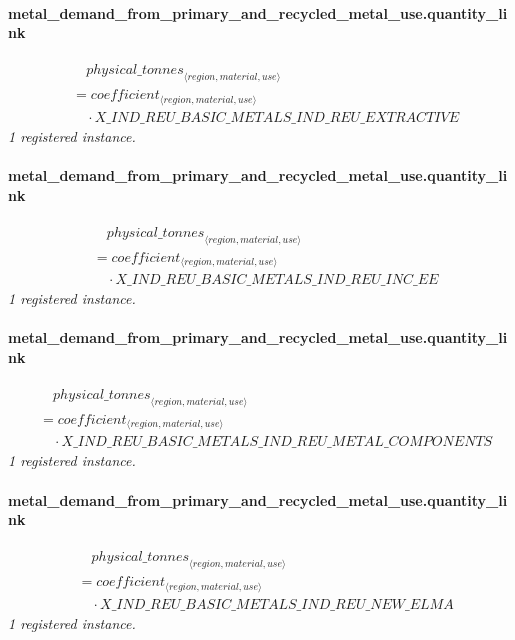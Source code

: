 \documentclass[11pt]{article}
\begin{document}
\paragraph{metal\_demand\_from\_primary\_and\_recycled\_metal\_use.quantity\_link}
\begin{align*}
&\quad {physical\_tonnes}_{\langle region, material, use\rangle}\\
&= coefficient_{\langle region, material, use\rangle}\\
&\quad {}\cdot X\_IND\_REU\_BASIC\_METALS\_IND\_REU\_EXTRACTIVE
\end{align*}
\noindent\emph{1 registered instance.}\par
\paragraph{metal\_demand\_from\_primary\_and\_recycled\_metal\_use.quantity\_link}
\begin{align*}
&\quad {physical\_tonnes}_{\langle region, material, use\rangle}\\
&= coefficient_{\langle region, material, use\rangle}\\
&\quad {}\cdot X\_IND\_REU\_BASIC\_METALS\_IND\_REU\_INC\_EE
\end{align*}
\noindent\emph{1 registered instance.}\par
\paragraph{metal\_demand\_from\_primary\_and\_recycled\_metal\_use.quantity\_link}
\begin{align*}
&\quad {physical\_tonnes}_{\langle region, material, use\rangle}\\
&= coefficient_{\langle region, material, use\rangle}\\
&\quad {}\cdot X\_IND\_REU\_BASIC\_METALS\_IND\_REU\_METAL\_COMPONENTS
\end{align*}
\noindent\emph{1 registered instance.}\par
\paragraph{metal\_demand\_from\_primary\_and\_recycled\_metal\_use.quantity\_link}
\begin{align*}
&\quad {physical\_tonnes}_{\langle region, material, use\rangle}\\
&= coefficient_{\langle region, material, use\rangle}\\
&\quad {}\cdot X\_IND\_REU\_BASIC\_METALS\_IND\_REU\_NEW\_ELMA
\end{align*}
\noindent\emph{1 registered instance.}\par
\end{document}
